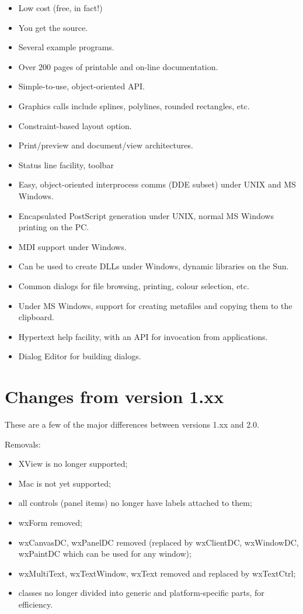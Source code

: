 \begin{itemize}\itemsep=0pt
\item Low cost (free, in fact!)
\item You get the source.
\item Several example programs.
\item Over 200 pages of printable and on-line documentation.
\item Simple-to-use, object-oriented API.
\item Graphics calls include splines, polylines, rounded rectangles, etc.
\item Constraint-based layout option.
\item Print/preview and document/view architectures.
\item Status line facility, toolbar
\item Easy, object-oriented interprocess comms (DDE subset) under UNIX and
MS Windows.
\item Encapsulated PostScript generation under UNIX, normal MS Windows printing on the
PC.
\item MDI support under Windows.
\item Can be used to create DLLs under Windows, dynamic libraries on the Sun.
\item Common dialogs for file browsing, printing, colour selection, etc.
\item Under MS Windows, support for creating metafiles and copying
them to the clipboard.
\item Hypertext help facility, with an API for invocation from applications.
\item Dialog Editor for building dialogs.
\end{itemize}

\section{Changes from version 1.xx}\label{versionchanges}

These are a few of the major differences between versions 1.xx and 2.0.

Removals:

\begin{itemize}\itemsep=0pt
\item XView is no longer supported;
\item Mac is not yet supported;
\item all controls (panel items) no longer have labels attached to them;
\item wxForm removed;
\item wxCanvasDC, wxPanelDC removed (replaced by wxClientDC, wxWindowDC, wxPaintDC which
can be used for any window);
\item wxMultiText, wxTextWindow, wxText removed and replaced by wxTextCtrl;
\item classes no longer divided into generic and platform-specific parts, for efficiency.
\end{itemize}

